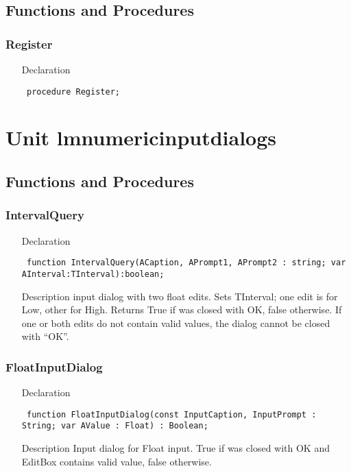 \documentclass[12pt,a4paper,oneside]{report}
\newcommand{\declarationitem}[1]{{\addfontfeatures{FakeBold=1.3} #1}}
\newcommand{\descriptiontitle}[1]{{\addfontfeatures{FakeSlant}#1}}
\newcommand{\code}[1]{\texttt{#1}}
\begin{document}
\section{Functions and Procedures}
\subsection{Register}
\label{lmnumericedits-Register}
\begin{itemize}\item[\declarationitem{Declaration}\hfill]
\begin{flushleft}
\code{
procedure Register;}

\end{flushleft}

\end{itemize}
\chapter{Unit lmnumericinputdialogs}
\label{lmnumericinputdialogs}
\section{Functions and Procedures}
\subsection{IntervalQuery}
\label{lmnumericinputdialogs-IntervalQuery}
\begin{itemize}\item[\declarationitem{Declaration}\hfill]
\begin{flushleft}
\code{
function IntervalQuery(ACaption, APrompt1, APrompt2 : string; var AInterval:TInterval):boolean;}

\end{flushleft}

\par
\item[\descriptiontitle{Description}]
input dialog with two float edits. Sets TInterval; one edit is for Low, other for High. Returns True if was closed with OK, false otherwise. If one or both edits do not contain valid values, the dialog cannot be closed with ``OK''.

\end{itemize}
\subsection{FloatInputDialog}
\label{lmnumericinputdialogs-FloatInputDialog}
\begin{itemize}\item[\declarationitem{Declaration}\hfill]
\begin{flushleft}
\code{
function FloatInputDialog(const InputCaption, InputPrompt : String; var AValue : Float) : Boolean;}
\end{flushleft}
\item[\descriptiontitle{Description}]
Input dialog for Float input. True if was closed with OK and EditBox contains valid value, false otherwise. 
\end{itemize}
\end{document}
